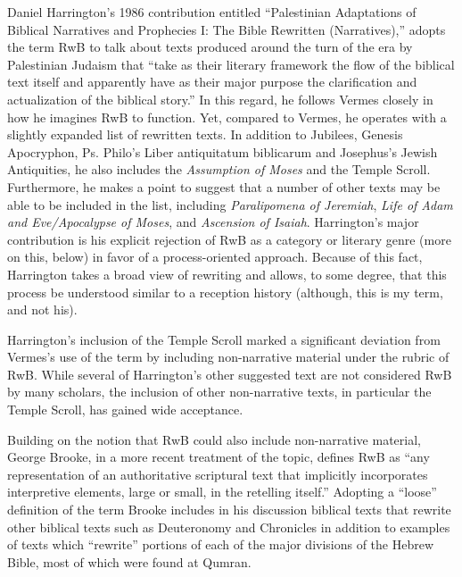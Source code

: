 Daniel Harrington's 1986 contribution entitled ``Palestinian Adaptations
of Biblical Narratives and Prophecies I: The Bible Rewritten
(Narratives),'' adopts the term RwB to talk about texts produced around
the turn of the era by Palestinian Judaism that ``take as their literary
framework the flow of the biblical text itself and apparently have as
their major purpose the clarification and actualization of the biblical
story.''\autocite[239]{harrington_kraft-nickelsburg1986} In this regard,
he follows Vermes closely in how he imagines RwB to function. Yet,
compared to Vermes, he operates with a slightly expanded list of
rewritten texts. In addition to Jubilees, Genesis Apocryphon, Ps.
Philo's Liber antiquitatum biblicarum and Josephus's Jewish Antiquities,
he also includes the \emph{Assumption of Moses} and the Temple Scroll.
Furthermore, he makes a point to suggest that a number of other texts
may be able to be included in the list, including \emph{Paralipomena of
Jeremiah}, \emph{Life of Adam and Eve/Apocalypse of Moses}, and
\emph{Ascension of Isaiah}. Harrington's major contribution is his
explicit rejection of RwB as a category or literary genre (more on this,
below) in favor of a process-oriented approach. Because of this fact,
Harrington takes a broad view of rewriting and allows, to some degree,
that this process be understood similar to a reception history
(although, this is my term, and not his).

Harrington's inclusion of the Temple Scroll marked a significant
deviation from Vermes's use of the term by including non-narrative
material under the rubric of RwB. While several of Harrington's other
suggested text are not considered RwB by many scholars, the inclusion of
other non-narrative texts, in particular the Temple Scroll, has gained
wide acceptance.\autocite{bernstein_textus2005}

Building on the notion that RwB could also include non-narrative
material, George Brooke, in a more recent treatment of the topic,
defines RwB as ``any representation of an authoritative scriptural text
that implicitly incorporates interpretive elements, large or small, in
the retelling itself.''\autocite[777]{brooke_schiffman-vanderkam2000}
Adopting a ``loose'' definition of the term Brooke includes in his
discussion biblical texts that rewrite other biblical texts such as
Deuteronomy and Chronicles in addition to examples of texts which
``rewrite'' portions of each of the major divisions of the Hebrew Bible,
most of which were found at Qumran.\autocites[Brooke categorizes the
texts as follows: Reworked Pentateuchs, Rewritten Pentateuchal
narratives, Rewritten Pentateuchal laws, Rewritten Former Prophets,
Rewritten Latter Prophets, and Rewritten
Writings.][778--780]{brooke_schiffman-vanderkam2000}[See
also][]{brooke_herbert-tov2002}

